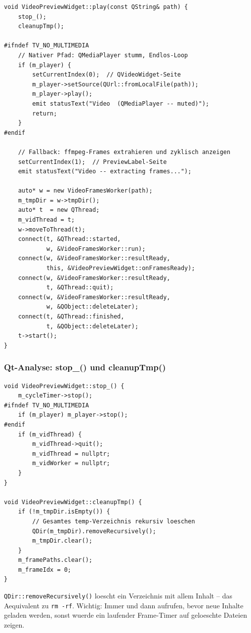 \begin{lstlisting}[caption={play: zwei Codepfade je nach Multimedia-Verfuegbarkeit}]
void VideoPreviewWidget::play(const QString& path) {
    stop_();
    cleanupTmp();

#ifndef TV_NO_MULTIMEDIA
    // Nativer Pfad: QMediaPlayer stumm, Endlos-Loop
    if (m_player) {
        setCurrentIndex(0);  // QVideoWidget-Seite
        m_player->setSource(QUrl::fromLocalFile(path));
        m_player->play();
        emit statusText("Video  (QMediaPlayer -- muted)");
        return;
    }
#endif

    // Fallback: ffmpeg-Frames extrahieren und zyklisch anzeigen
    setCurrentIndex(1);  // PreviewLabel-Seite
    emit statusText("Video -- extracting frames...");

    auto* w = new VideoFramesWorker(path);
    m_tmpDir = w->tmpDir();
    auto* t  = new QThread;
    m_vidThread = t;
    w->moveToThread(t);
    connect(t, &QThread::started,
            w, &VideoFramesWorker::run);
    connect(w, &VideoFramesWorker::resultReady,
            this, &VideoPreviewWidget::onFramesReady);
    connect(w, &VideoFramesWorker::resultReady,
            t, &QThread::quit);
    connect(w, &VideoFramesWorker::resultReady,
            w, &QObject::deleteLater);
    connect(t, &QThread::finished,
            t, &QObject::deleteLater);
    t->start();
}
\end{lstlisting}

\subsubsection{Qt-Analyse: stop\_() und cleanupTmp()}

\begin{lstlisting}[caption={stop\_ und cleanupTmp: aufraeuemen vor neuem Inhalt}]
void VideoPreviewWidget::stop_() {
    m_cycleTimer->stop();
#ifndef TV_NO_MULTIMEDIA
    if (m_player) m_player->stop();
#endif
    if (m_vidThread) {
        m_vidThread->quit();
        m_vidThread = nullptr;
        m_vidWorker = nullptr;
    }
}

void VideoPreviewWidget::cleanupTmp() {
    if (!m_tmpDir.isEmpty()) {
        // Gesamtes temp-Verzeichnis rekursiv loeschen
        QDir(m_tmpDir).removeRecursively();
        m_tmpDir.clear();
    }
    m_framePaths.clear();
    m_frameIdx = 0;
}
\end{lstlisting}

\verb|QDir::removeRecursively()| loescht ein Verzeichnis
mit allem Inhalt -- das Aequivalent zu \texttt{rm -rf}.
Wichtig: Immer  und dann 
aufrufen, bevor neue Inhalte geladen werden, sonst wuerde
ein laufender Frame-Timer auf geloeschte Dateien zeigen.


